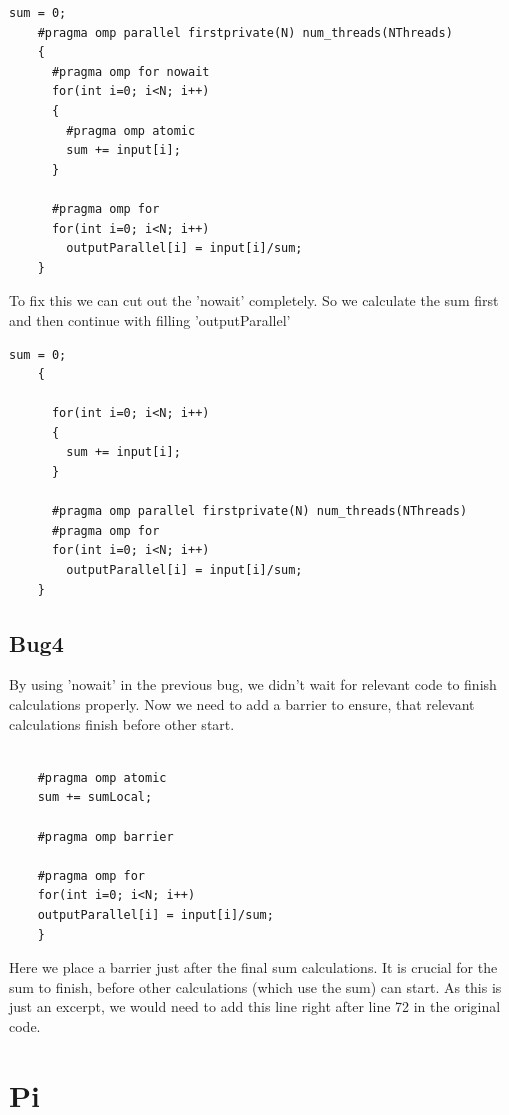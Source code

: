 \documentclass{article}
\begin{document}
\begin{lstlisting}[caption=Step 2]
    sum = 0;
    #pragma omp parallel firstprivate(N) num_threads(NThreads)
    {
      #pragma omp for nowait
      for(int i=0; i<N; i++)
      {
        #pragma omp atomic
        sum += input[i];
      }
  
      #pragma omp for 
      for(int i=0; i<N; i++)
        outputParallel[i] = input[i]/sum;
    }
\end{lstlisting}
To fix this we can cut out the 'nowait' completely.
So we calculate the sum first and then continue with filling 'outputParallel'
\begin{lstlisting}[caption=Step 2]
    sum = 0;
    {
  
      for(int i=0; i<N; i++)
      {
        sum += input[i];
      }
      
      #pragma omp parallel firstprivate(N) num_threads(NThreads)
      #pragma omp for 
      for(int i=0; i<N; i++)
        outputParallel[i] = input[i]/sum;
    }
\end{lstlisting}
\subsection*{Bug4}
By using 'nowait' in the previous bug, we didn't wait for relevant code to finish calculations properly.
Now we need to add a barrier to ensure, that relevant calculations finish before other start.
\begin{lstlisting}[caption=Step 2]

    #pragma omp atomic
    sum += sumLocal;
    
    #pragma omp barrier
    
    #pragma omp for
    for(int i=0; i<N; i++)
    outputParallel[i] = input[i]/sum;
    }
\end{lstlisting}
Here we place a barrier just after the final sum calculations.
It is crucial for the sum to finish, before other calculations (which use the sum) can start.
As this is just an excerpt, we would need to add this line right after line 72 in the original code.

\section{Pi}
\end{document}

